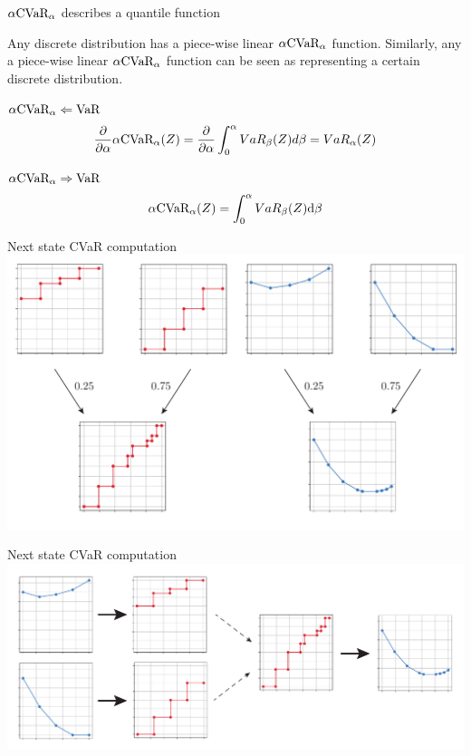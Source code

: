\documentclass{beamer}
\begin{document}
\begin{frame}{$\alpha\text{CVaR}_\alpha$ describes a quantile function}
\begin{lemma}
Any discrete distribution has a piece-wise linear $\alpha\text{CVaR}_\alpha$ function. Similarly, any a piece-wise linear $\alpha\text{CVaR}_\alpha$ function can be seen as representing a certain discrete distribution.
\end{lemma}

\begin{block}{$\alpha\text{CVaR}_\alpha 	\Leftarrow \text{VaR}$}
$$\dfrac{\partial}{\partial \alpha} \alpha \text{CVaR}_\alpha(Z) = \dfrac{\partial}{\partial \alpha} \int_0^\alpha VaR_\beta(Z) d\beta = VaR_\alpha(Z)$$
\end{block}


\begin{block}{$\alpha\text{CVaR}_\alpha 	\Rightarrow \text{VaR}$}
$$\alpha \text{CVaR}_\alpha(Z) = \int_0^\alpha VaR_\beta(Z) \text{d} \beta$$
\end{block}

\end{frame}


\begin{frame}{Next state CVaR computation}
\center
\includegraphics[width=\linewidth]{../gfx/multivarvar.pdf}
\end{frame}


\begin{frame}{Next state CVaR computation}
\center
\includegraphics[width=\linewidth]{../gfx/cvar_vi_conversion.pdf}
\end{frame}
\end{document}
